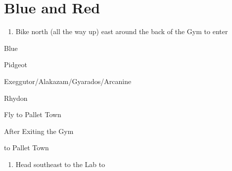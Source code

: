 \chapter{Blue and Red}
\vspace{0.5mm}

\begin{paracol}{2}
\begin{enumerate}
	\item Bike north (all the way up) \pointRight{} east \pointRight{} around the back of the Gym to enter
\end{enumerate}

\begin{boss}{Blue}
	\varwb
	\begin{fightSection}{Pidgeot}
		\item \xAttack{} 
		\begin{notes}
			\item {}
		\end{notes}
		\item {}
		\item {} \return
	\end{fightSection}
	\begin{fightSection}{Exeggutor/Alakazam/Gyarados/Arcanine}
		\item {} \return{} 
	\end{fightSection}
	\begin{fightSection}{Rhydon}
		\item {} \surf
	\end{fightSection}
	\varwe
\end{boss}

\switchcolumn
\vspace{2.48cm}
\begin{story}{Fly to Pallet Town}
	\varwb
	\varwe
\end{story}

\switchcolumn
\begin{menu}{After Exiting the Gym}
	\varwb
	\begin{pokeMenu}
		\item {} \fly{} to Pallet Town \menuHlTwo{(\pointUp)}
	\end{pokeMenu}
	\varwe
\end{menu}

\begin{enumerate}[resume]
	\item Head southeast to the Lab to 
\end{enumerate}


\end{paracol}
